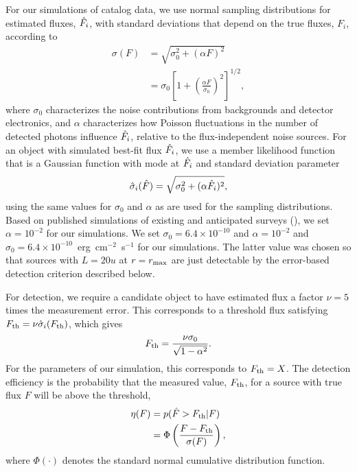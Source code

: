 For our simulations of catalog data, we use normal sampling distributions for estimated fluxes, $\hat{F}_i$, with standard deviations that depend on the true fluxes, $F_i$, according to
\begin{align}
\sigma(F)
  &= \sqrt{\sigma_0^2+(\alpha F)^2}\nonumber\\
  &= \sigma_0 \left[1 + \left(\frac{\alpha F}{\sigma_0}\right)^2 \right]^{1/2},
\label{eq:sig-F}
\end{align}
where $\sigma_0$ characterizes the noise contributions from backgrounds and detector electronics, and $\alpha$ characterizes how Poisson fluctuations in the number of detected photons influence $\hat{F}_i$, relative to the flux-independent noise sources.
For an object with simulated best-fit flux $\hat{F}_i$, we use a member likelihood function that is a Gaussian function with mode at $\hat{F}_i$ and standard deviation parameter
\begin{equation}
\hat{\sigma}_i(\hat{F})
  = \sqrt{\sigma_0^2+(\alpha \hat{F}_i)^2},
\label{eq:sig-Fhat}
\end{equation}
using the same values for $\sigma_0$ and $\alpha$ as are used for the sampling distributions.
Based on published simulations of existing and anticipated surveys (\citealt{F99-SDSSSim,LSSTRefDesign}), we set $\alpha = 10^{-2}$ for our simulations.
We set $\sigma_0 = 6.4\times 10^{-10}$ and $\alpha = 10^{-2}$ and $\sigma_0 = 6.4\times 10^{-10}$~erg~cm$^{-2}$~s$^{-1}$ for our simulations.
The latter value was chosen so that sources with $L=20 u$ at $r=r_{\rm max}$ are just detectable by the error-based detection criterion described below.



For detection, we require a candidate object to have estimated flux a factor $\nu = 5$ times the measurement error.
This corresponds to a threshold flux satisfying $F_{\rm th} = \nu \hat{\sigma}_i(F_{\rm th})$, which gives
\begin{equation}\label{eq:Fth}
F_{\rm th} = \frac{\nu \sigma_0}{\sqrt{1-\alpha^2}}.
\end{equation}
For the parameters of our simulation, this corresponds to $F_{\rm th} = X$.
The detection efficiency is the probability that the measured value, $F_{\rm th}$, for a source with true flux $F$ will be above the threshold,
\begin{align}\label{key}
\eta(F)
  &= p(\hat{F} > F_{\rm th}|F)\nonumber\\
  &= \Phi\left(\frac{F - F_{\rm th}}{\sigma(F)}\right),
\end{align}
where $\Phi(\cdot)$ denotes the standard normal cumulative distribution function.



